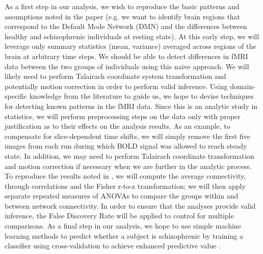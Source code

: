 \documentclass[11pt]{article}
\begin{document}
As a first step in our analysis, we wish to reproduce the basic patterns and
assumptions noted in the paper (e.g. we want to identify brain regions that
correspond to the Default Mode Network (DMN) and the differences between
healthy and schizophrenic individuals at resting state). At this early step,
we will leverage only summary statistics (mean, variance) averaged across 
regions of the brain at arbitrary time steps. We should be able to detect 
differences in fMRI data between the two groups of individuals using this 
naive approach. We will likely need to perform Talairach coordinate system 
transformation and potentially motion correction in order to perform valid 
inference. Using domain-specific knowledge from the literature to guide us, 
we hope to devise techniques for detecting known patterns in the fMRI data. 
Since this is an analytic study in statistics, we will perform preprocessing
steps on the data only with proper justification as to their effects on the 
analysis results. As an example, to compensate for slice-dependent time shifts,
we will simply remove the first five images from each run during which BOLD 
signal was allowed to reach steady state. In addition, we may need to perform
Talairach coordinate transformation and motion correction if necessary when 
we are further in the analytic process. To reproduce the results noted in 
\cite{repovs2011}, we will compute the average connectivity, through 
correlations and the Fisher r-to-z transformation; we will then apply separate
repeated measures of ANOVAs to compare the groups within and between network
connectivity. In order to ensure that the analyses provide valid inference, 
the False Discovery Rate will be applied to control for multiple comparisons. 
As a final step in our analysis, we hope to use simple machine learning methods
to predict whether a subject is schizophrenic by training a classifier using
cross-validation to achieve enhanced predictive value \cite{arbabshirani2013}.


\end{document}
